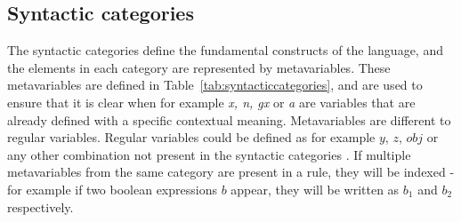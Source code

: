 \subsection{Syntactic categories}
The syntactic categories define the fundamental constructs of the language, and the elements in each category are represented by metavariables. These metavariables are defined in Table~\ref{tab:syntacticcategories}, and are used to ensure that it is clear when for example \textit{x, n, gx} or \textit{a} are variables that are already defined with a specific contextual meaning. Metavariables are different to regular variables. Regular variables could be defined as for example $y$, $z$, $obj$ or any other combination not present in the syntactic categories \cite{PilenVedTraeetsRod}. If multiple metavariables from the same category are present in a rule, they will be indexed - for example if two boolean expressions $b$ appear, they will be written as $b_1$ and $b_2$ respectively. 
